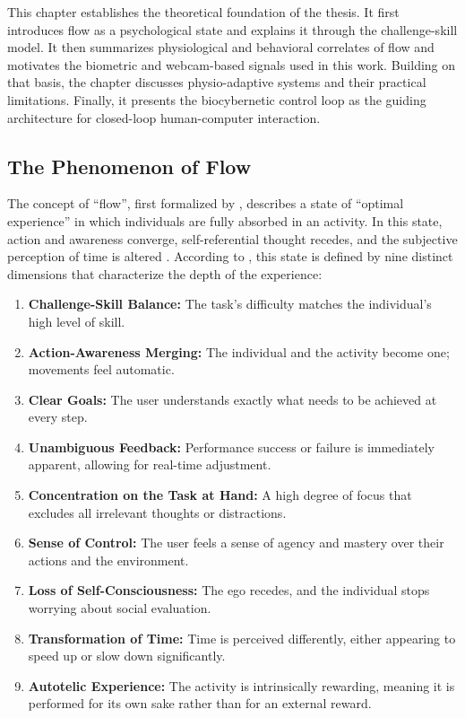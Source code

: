 This chapter establishes the theoretical foundation of the thesis. It first introduces flow as a psychological state and explains it through the challenge-skill model. It then summarizes physiological and behavioral correlates of flow and motivates the biometric and webcam-based signals used in this work. Building on that basis, the chapter discusses physio-adaptive systems and their practical limitations. Finally, it presents the biocybernetic control loop as the guiding architecture for closed-loop human-computer interaction.

\subsection{The Phenomenon of Flow}

The concept of \enquote{flow}, first formalized by \textcite{inbook}, describes a state of \enquote{optimal experience} in which individuals are fully absorbed in an activity. In this state, action and awareness converge, self-referential thought recedes, and the subjective perception of time is altered \autocite{nah2014flow}. According to \textcite{inbook}, this state is defined by nine distinct dimensions that characterize the depth of the experience:

\begin{enumerate}
    \item \textbf{Challenge-Skill Balance:} The task's difficulty matches the individual's high level of skill.
    \item \textbf{Action-Awareness Merging:} The individual and the activity become one; movements feel automatic.
    \item \textbf{Clear Goals:} The user understands exactly what needs to be achieved at every step.
    \item \textbf{Unambiguous Feedback:} Performance success or failure is immediately apparent, allowing for real-time adjustment.
    \item \textbf{Concentration on the Task at Hand:} A high degree of focus that excludes all irrelevant thoughts or distractions.
    \item \textbf{Sense of Control:} The user feels a sense of agency and mastery over their actions and the environment.
    \item \textbf{Loss of Self-Consciousness:} The ego recedes, and the individual stops worrying about social evaluation.
    \item \textbf{Transformation of Time:} Time is perceived differently, either appearing to speed up or slow down significantly.
    \item \textbf{Autotelic Experience:} The activity is intrinsically rewarding, meaning it is performed for its own sake rather than for an external reward.
\end{enumerate}

